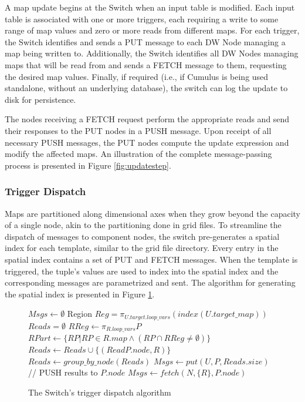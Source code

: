 \documentclass{sig-alternate}
\begin{document}
A map update begins at the Switch when an input table is modified.  Each input table is associated with one or more triggers, each requiring a write to some range of map values and zero or more reads from different maps.  For each trigger, the Switch identifies and sends a PUT message to each DW Node managing a map being written to.  Additionally, the Switch identifies all DW Nodes managing maps that will be read from and sends a FETCH message to them, requesting the desired map values.  Finally, if required (i.e., if Cumulus is being used standalone, without an underlying database), the switch can log the update to disk for persistence.

The nodes receiving a FETCH request perform the appropriate reads and send their responses to the PUT nodes in a PUSH message.  Upon receipt of all necessary PUSH messages, the PUT nodes compute the update expression and modify the affected maps.  An illustration of the complete message-passing process is presented in Figure \ref{fig:updatestep}.  

\subsubsection{Trigger Dispatch}
Maps are partitioned along dimensional axes when they grow beyond the capacity of a single node, akin to the partitioning done in grid files\cite{318586}.  To streamline the dispatch of messages to component nodes, the switch pre-generates a spatial index for each template, similar to the grid file directory.  Every entry in the spatial index contains a set of PUT and FETCH messages.  When the template is triggered, the tuple's values are used to index into the spatial index and the corresponding messages are parametrized and sent.  The algorithm for generating the spatial index is presented in Figure \ref{alg:dispatch}.

\begin{figure}
\begin{algorithmic}[1]
\STATE $Msgs \leftarrow \emptyset$
	\STATE Region $Reg = \pi_{U.target.loop\_vars} \left(index(U.target\_map)\right)$
		\STATE $Reads = \emptyset$
			\STATE $RReg \leftarrow \pi_{R.loop\_vars} P$
			\STATE $RPart \leftarrow \{RP | RP\in R.map \wedge (RP \cap RReg \neq \emptyset)\}$
			\STATE $Reads \leftarrow Reads \cup \{(ReadP.node, R)\}$
		\ENDFOR
		\STATE $Reads \leftarrow group\_by\_node(Reads)$
		\STATE $Msgs \leftarrow put(U, P, Reads.size)$
		  \STATE // PUSH results to $P.node$
			\STATE $Msgs \leftarrow fetch(N, \{R\}, P.node)$
		\ENDFOR
	\ENDFOR
\ENDFOR
\end{algorithmic}
\caption{The Switch's trigger dispatch algorithm}
\label{alg:dispatch}
\end{figure}
\end{document}
